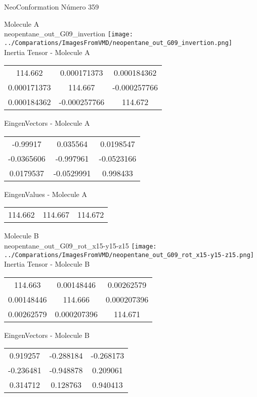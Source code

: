 \vtab[-2cm]
\begin{center}
{\large NeoConformation \tab Número 359}
\end{center}
\begin{multicols}{2}
\begin{center}

Molecule A \\ 
neopentane\_out\_G09\_invertion
\texttt{[image: ../Comparations/ImagesFromVMD/neopentane\_out\_G09\_invertion.png]}
\\
Inertia Tensor - Molecule A \\
\vtab

\begin{tabular}{|c c c|}
114.662	 & 	0.000171373	 & 	0.000184362	 \\
0.000171373	 & 	114.667	 & 	-0.000257766	 \\
0.000184362	 & 	-0.000257766	 & 	114.672
\end{tabular}

\vtab
 EingenVectors - Molecule A     \\
\vtab
\begin{tabular}{|c c c|}
-0.99917	 & 	0.035564	 & 	0.0198547	 \\
-0.0365606	 & 	-0.997961	 & 	-0.0523166	 \\
0.0179537	 & 	-0.0529991	 & 	0.998433
\end{tabular}

\vtab
 EingenValues - Molecule A     \\
\vtab
\begin{tabular}{|c c c|}
114.662	 & 	114.667	 & 	114.672	 \\
\end{tabular}
\columnbreak

Molecule B \\ 
neopentane\_out\_G09\_rot\_x15-y15-z15
\texttt{[image: ../Comparations/ImagesFromVMD/neopentane\_out\_G09\_rot\_x15-y15-z15.png]}
\\
Inertia Tensor - Molecule B \\
\vtab

\begin{tabular}{|c c c|}
114.663	 & 	0.00148446	 & 	0.00262579	 \\
0.00148446	 & 	114.666	 & 	0.000207396	 \\
0.00262579	 & 	0.000207396	 & 	114.671
\end{tabular}

\vtab
 EingenVectors - Molecule B     \\
\vtab
\begin{tabular}{|c c c|}
0.919257	 & 	-0.288184	 & 	-0.268173	 \\
-0.236481	 & 	-0.948878	 & 	0.209061	 \\
0.314712	 & 	0.128763	 & 	0.940413
\end{tabular}


\end{center}
\end{multicols}
